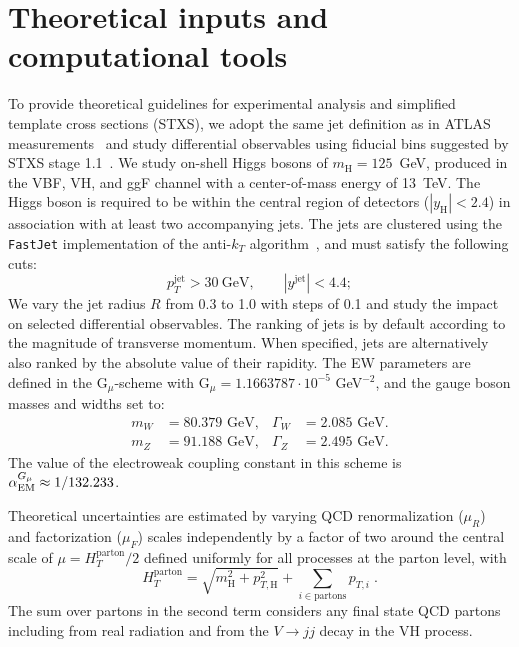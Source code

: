 \documentclass[10pt,prd,fleqn,superscriptaddress,notitlepage,nofootinbib,preprintnumbers,nobalancelastpage]{revtex4-1}
\newcommand{\VBF}{VBF\xspace}
\newcommand{\VH}{VH\xspace}
\begin{document}
\section{Theoretical inputs and computational tools}
\label{sec:setup}
To provide theoretical guidelines for experimental analysis and simplified template cross sections (STXS), we adopt the same jet definition as in ATLAS measurements~\cite{Buhrer:2019npn,ATLAS:2019jst} and study differential observables using fiducial bins suggested by STXS stage 1.1~\cite{Berger:2019wnu}. We study on-shell Higgs bosons of $m_{\text{H}}=125$~GeV, produced in the \VBF, \VH, and ggF channel with a center-of-mass energy of 13~TeV. The Higgs boson is required to be within the central region of detectors ($|y_{\text{H}}|<2.4$) in association with at least two accompanying jets. The jets are clustered using the {\tt FastJet} implementation of the anti-$k_T$ algorithm~\cite{Cacciari:2011ma}, and must satisfy the following cuts:
\begin{equation}
p_T^{\text{jet}} > 30\ \text{GeV}, \qquad  |y^{\text{jet}}|<4.4;
\end{equation}
We vary the jet radius $R$ from 0.3 to 1.0 with steps of 0.1 and study the impact on selected differential observables. The ranking of jets is by default according to the magnitude of transverse momentum. When specified, jets are alternatively also ranked by the absolute value of their rapidity. The EW parameters are defined in the G$_\mu$-scheme with G$_\mu=1.1663787\cdot 10^{-5}$ GeV$^{-2}$, and the gauge boson masses and widths set to:
\begin{align}
    m_{W}&=80.379 \text{~GeV}, & \Gamma_{W}&=2.085 \text{~GeV}. \\
    m_{Z}&=91.188 \text{~GeV}, & \Gamma_{Z}&=2.495 \text{~GeV}.
\end{align}
The value of the electroweak coupling constant in this scheme is $\alpha_{\rm EM}^{G_\mu}\approx 1/132.233$.

Theoretical uncertainties are estimated by varying QCD renormalization ($\mu_R$) and factorization ($\mu_F$) scales independently by a factor of two around the central scale of $\mu=H_T^{\text{parton}}/2$ defined uniformly for all processes at the parton level, with
\begin{equation}\label{eq:murf}
   H_T^{\text{parton}} = \sqrt{m^2_{\text{H}}+p_{T,\text{H}}^2} + \sum_{i \in \text{partons}} p_{T, i}\;.
\end{equation}
The sum over partons in the second term considers any final state QCD partons including from real radiation and from the $V\to jj$ decay in the \VH process.
\end{document}
